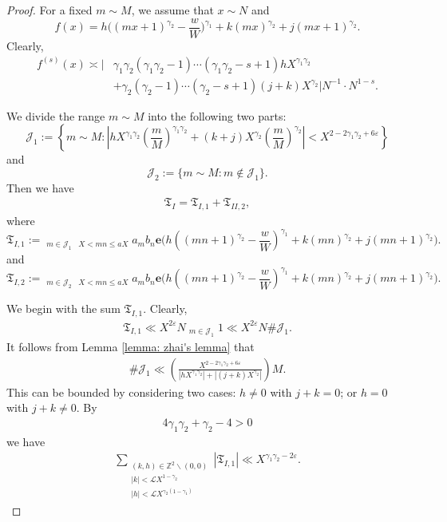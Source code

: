 \documentclass[12pt, reqno, twoside, letterpaper]{amsart}
\numberwithin{equation}{section}
\newcommand{\cL}{\ensuremath{\mathcal{L}}}
\newcommand{\ZZ}{\ensuremath{\mathbb{Z}}}
\theoremstyle{customthm}
\theoremstyle{customrem}
\begin{document}
\begin{proof} For a fixed $m\sim M$, we assume that $x\sim N$ and
	$$
	f(x)=h\Big((mx+1)^{\gamma_2}-\frac{w}{W}\Big)^{\gamma_1}
	+k(mx)^{\gamma_2}+j(mx+1)^{\gamma_2}.
	$$
	Clearly,
	\begin{align*}
		f^{(s)}(x)\asymp \bigg|&\gamma_1\gamma_2(\gamma_1\gamma_2-1)\cdots(\gamma_1\gamma_2-s+1)
		hX^{\gamma_1\gamma_2}\\
		&+\gamma_2(\gamma_2-1)\cdots(\gamma_2-s+1)(j+k)X^{\gamma_2}\bigg|N^{-1}\cdot N^{1-s}.
	\end{align*}
	
	We divide the range $m\sim M$ into the following two parts:
	$$
	\mathcal{J}_1:=\left\{m\sim M: \left|hX^{\gamma_1\gamma_2}\left(\frac{m}{M}\right)
	^{\gamma_1\gamma_2}
	+(k+j)X^{\gamma_2}\left(\frac{m}{M}\right)^{\gamma_2}\right|<
	X^{2-2\gamma_1\gamma_2+6\varepsilon}\right\}
	$$
	and
	$$
	\mathcal{J}_2:=\{m\sim M: m\notin\mathcal{J}_1\}.
	$$
	Then we have
	\begin{align*}
		\mathfrak{T}_{I}=\mathfrak{T}_{I,1}+\mathfrak{T}_{II,2},
	\end{align*}
	where
	$$
	\mathfrak{T}_{I,1}:=\mathop{\sum_{m\sim M}}_{m\in\mathcal{J}_1}
    \mathop{\sum_{n\sim N}}_{X < mn \leqslant aX}
	a_mb_n\mathbf{e}\Big(h\left((mn+1)^{\gamma_2}-\frac{w}{W}\right)^{\gamma_1}
	+k(mn)^{\gamma_2}+j(mn+1)^{\gamma_2}\Big).
	$$
	and
	$$
	\mathfrak{T}_{I,2}:=\mathop{\sum_{m\sim M}}_{m\in\mathcal{J}_2}
    \mathop{\sum_{n\sim N}}_{X < mn \leqslant aX}
	a_mb_n\mathbf{e}\Big(h\left((mn+1)^{\gamma_2}-\frac{w}{W}\right)^{\gamma_1}
	+k(mn)^{\gamma_2}+j(mn+1)^{\gamma_2}\Big).
	$$
	
	We begin with the sum $\mathfrak{T}_{I,1}$. Clearly,
	\begin{align*}
		\mathfrak{T}_{I,1}\ll X^{2\varepsilon}N\mathop{\sum_{m\sim M}}_{m\in\mathcal{J}_1}1
		\ll X^{2\varepsilon}N\#\mathcal{J}_1.
	\end{align*}
	It follows from Lemma \ref{lemma: zhai's lemma} that
	\begin{align*}
		\#\mathcal{J}_1\ll \left(\frac{X^{2-2\gamma_1\gamma_2+6\varepsilon}}{|hX^{\gamma_1\gamma_2}|
			+|(j+k)X^{\gamma_2}|}\right)M.
	\end{align*}
   This can be bounded by considering two cases: $h\neq0$ with $j+k=0$; or $h=0$
   with $j+k\neq0$. By
	\begin{align*}
		4\gamma_1\gamma_2+\gamma_2-4>0
	\end{align*}
	we have
	\begin{align*}
		\sum_{\substack{(k,h) \in \ZZ^2 \backslash (0,0) \\ |k|<\cL X^{1-\gamma_2} \\
        |h|<\cL X^{\gamma_2(1-\gamma_1)}}}
		|\mathfrak{T}_{I,1}|\ll X^{\gamma_1\gamma_2-2\varepsilon}.
	\end{align*}
	

\end{proof}
\end{document}
